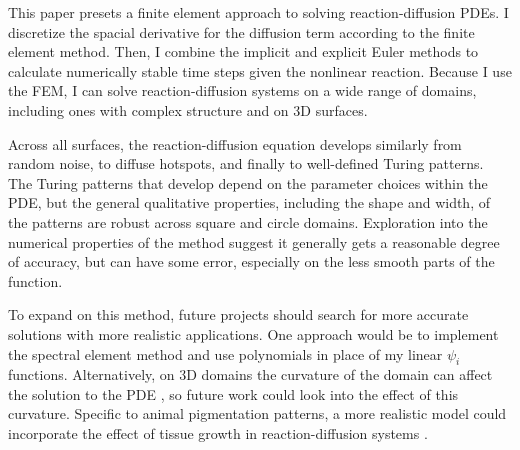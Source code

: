 This paper presets a finite element approach to solving reaction-diffusion PDEs. I discretize the spacial derivative for the diffusion term according to the finite element method. Then, I combine the implicit and explicit Euler methods to calculate numerically stable time steps given the nonlinear reaction. Because I use the FEM, I can solve reaction-diffusion systems on a wide range of domains, including ones with complex structure and on 3D surfaces.

Across all surfaces, the reaction-diffusion equation develops similarly from random noise, to diffuse hotspots, and finally to well-defined Turing patterns. The Turing patterns that develop depend on the parameter choices within the PDE, but the general qualitative properties, including the shape and width, of the patterns are robust across square and circle domains. Exploration into the numerical properties of the method suggest it generally gets a reasonable degree of accuracy, but can have some error, especially on the less smooth parts of the function.

To expand on this method, future projects should search for more accurate solutions with more realistic applications. One approach would be to implement the spectral element method \parencite{hafeez2023review} and use polynomials in place of my linear $\psi_i$ functions. Alternatively, on 3D domains the curvature of the domain can affect the solution to the PDE \parencites{staddon2024zebra}{leon2021full}, so future work could look into the effect of this curvature. Specific to animal pigmentation patterns, a more realistic model could incorporate the effect of tissue growth in reaction-diffusion systems \parencite{de2020leopard}.
